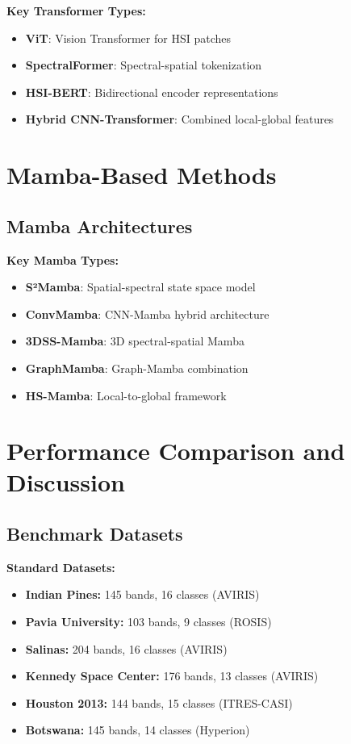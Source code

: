 \documentclass[12pt,a4paper]{article}
\begin{document}
\textbf{Key Transformer Types:}
\begin{itemize}
\item \textbf{ViT}: Vision Transformer for HSI patches
\item \textbf{SpectralFormer}: Spectral-spatial tokenization \cite{sun2022spectral}
\item \textbf{HSI-BERT}: Bidirectional encoder representations
\item \textbf{Hybrid CNN-Transformer}: Combined local-global features
\end{itemize}

\section{Mamba-Based Methods}

\subsection{Mamba Architectures}

\textbf{Key Mamba Types:}
\begin{itemize}
\item \textbf{S²Mamba}: Spatial-spectral state space model
\item \textbf{ConvMamba}: CNN-Mamba hybrid architecture
\item \textbf{3DSS-Mamba}: 3D spectral-spatial Mamba
\item \textbf{GraphMamba}: Graph-Mamba combination \cite{ahmad2021graphmamba}
\item \textbf{HS-Mamba}: Local-to-global framework \cite{pan2024mambalg}
\end{itemize}





\section{Performance Comparison and Discussion}

\subsection{Benchmark Datasets}

\textbf{Standard Datasets:}
\begin{itemize}
\item \textbf{Indian Pines:} 145 bands, 16 classes (AVIRIS)
\item \textbf{Pavia University:} 103 bands, 9 classes (ROSIS)
\item \textbf{Salinas:} 204 bands, 16 classes (AVIRIS)
\item \textbf{Kennedy Space Center:} 176 bands, 13 classes (AVIRIS)
\item \textbf{Houston 2013:} 144 bands, 15 classes (ITRES-CASI)
\item \textbf{Botswana:} 145 bands, 14 classes (Hyperion)
\end{itemize}
\end{document}
